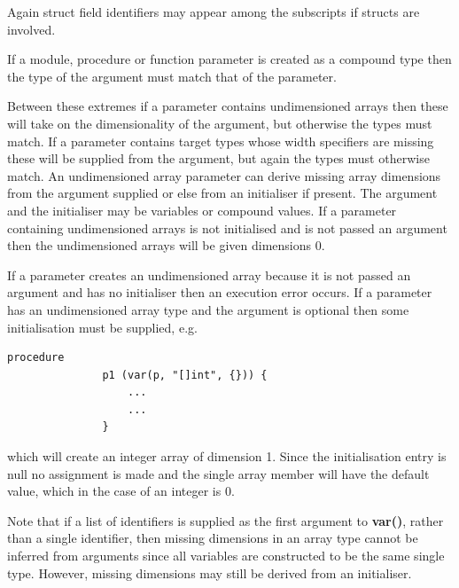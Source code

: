             Again struct field identifiers may appear among the subscripts if
            structs are involved.
            
            If a module, procedure or function parameter is created as
            a compound type then the type of the argument must match
            that of the parameter.
            
            Between these extremes if a parameter contains undimensioned arrays
            then these will take on the dimensionality of the argument, but
            otherwise the types must match. If a parameter contains target types
            whose width specifiers are missing these will be supplied from the
            argument, but again the types must otherwise match. An undimensioned
            array parameter can derive missing array dimensions from the argument
            supplied or else from an initialiser if present. The argument and the
            initialiser may be variables or compound values. If a parameter
            containing undimensioned arrays is not initialised and is not passed
            an argument then the undimensioned arrays will be given dimensions
            0.
            
            If a parameter creates an undimensioned array because it is
            not passed an argument and has no initialiser then an execution
            error occurs. If a parameter has an undimensioned array type
            and the argument is optional then some initialisation must be
            supplied, e.g.
            \begin{lstlisting}[gobble=12, language=threepl]
               procedure
               p1 (var(p, "[]int", {})) {
                   ...
                   ...
               }
            \end{lstlisting}
            which will create an integer array of dimension 1. Since the
            initialisation entry is null no assignment is made and the
            single array member will have the default value, which in the case
            of an integer is 0.
            
            Note that if a list of identifiers is supplied as the first argument to
            {\bf var()}, rather than a single identifier, then missing dimensions in
            an array type cannot be inferred from arguments since all variables are
            constructed to be the same single type. However, missing dimensions may
            still be derived from an initialiser.
            
